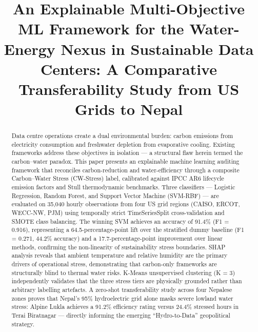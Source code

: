 \documentclass[conference]{IEEEtran}
\begin{document}
\title{An Explainable Multi-Objective ML Framework for the Water-Energy Nexus in Sustainable Data Centers: A Comparative Transferability Study from US Grids to Nepal}

\author{
}

\maketitle



\begin{abstract}
Data centre operations create a dual environmental burden: carbon emissions from electricity consumption and freshwater depletion from evaporative cooling. Existing frameworks address these objectives in isolation — a structural flaw herein termed the carbon–water paradox. This paper presents an explainable machine learning auditing framework that reconciles carbon-reduction and water-efficiency through a composite Carbon–Water Stress (CW-Stress) label, calibrated against IPCC AR6 lifecycle emission factors and Stull thermodynamic benchmarks. Three classifiers — Logistic Regression, Random Forest, and Support Vector Machine (SVM-RBF) — are evaluated on 35,040 hourly observations from four US grid regions (CAISO, ERCOT, WECC-NW, PJM) using temporally strict TimeSeriesSplit cross-validation and SMOTE class balancing. The winning SVM achieves an accuracy of 91.4\% (F1 = 0.916), representing a 64.5-percentage-point lift over the stratified dummy baseline (F1 = 0.271, 44.2\% accuracy) and a 17.7-percentage-point improvement over linear methods, confirming the non-linearity of sustainability stress boundaries.
 SHAP analysis reveals that ambient temperature and relative humidity are the primary drivers of operational stress, demonstrating that carbon-only frameworks are structurally blind to thermal water risks. K-Means unsupervised clustering (K = 3) independently validates that the three stress tiers are physically grounded rather than arbitrary labelling artefacts. A zero-shot transferability study across four Nepalese zones proves that Nepal's 95\% hydroelectric grid alone masks severe lowland water stress: Alpine Lukla achieves a 91.2\% efficiency rating versus 24.4\% stressed hours in Terai Biratnagar — directly informing the emerging ``Hydro-to-Data'' geopolitical strategy.
\end{abstract}
\end{document}
